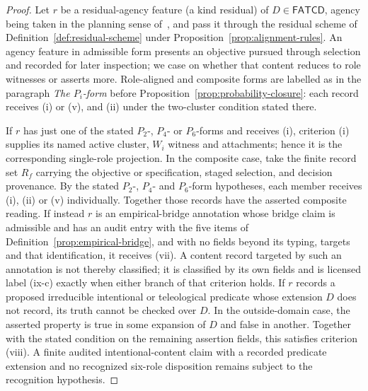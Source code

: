 \documentclass[11pt]{article}
\theoremstyle{definition}
\newcommand{\FATCD}{\ensuremath{\mathsf{FATCD}}}
\begin{document}
\begin{proof}
Let \(r\) be a residual-agency feature (a kind residual) of
\(D \in \FATCD{}\), agency being taken in the planning sense
of~\citet{Bratman1987}, and pass it through the residual scheme of
Definition~\ref{def:residual-scheme} under
Proposition~\ref{prop:alignment-rules}. An agency feature in admissible
form presents an objective pursued through selection and recorded for
later inspection; we case on whether that content reduces to role
witnesses or asserts more. Role-aligned and composite forms are labelled as in the paragraph
\emph{The \(P_i\)-form} before Proposition~\ref{prop:probability-closure}: each
record receives (i) or (v), and (ii) under the two-cluster condition stated
there.

If \(r\) has just one of the stated \(P_2\)-, \(P_4\)- or \(P_6\)-forms and
receives (i), criterion (i) supplies its named active cluster, \(W_i\)
witness and attachments; hence it is the corresponding single-role
projection. In the composite case, take the finite record set \(R_f\) carrying
the objective or specification, staged selection, and decision
provenance. By the stated \(P_2\)-, \(P_4\)- and \(P_6\)-form
hypotheses, each member receives (i), (ii) or (v) individually.
Together those records have the asserted composite reading. If instead \(r\) is an empirical-bridge annotation whose bridge claim is admissible and has an
audit entry with the five items of Definition~\ref{prop:empirical-bridge}, and with
no fields beyond its typing, targets and that identification, it
receives (vii). A content record targeted by such an annotation is not thereby classified; it is classified by its own fields and is licensed label (ix-c) exactly when either branch of that criterion holds. If \(r\) records a
proposed irreducible intentional or teleological predicate whose extension
\(D\) does not record, its truth cannot be checked over \(D\). In the outside-domain case, the asserted property is true in some
expansion of \(D\) and false in another. Together with the stated
condition on the remaining assertion fields, this satisfies
criterion (viii). A finite audited intentional-content claim with a recorded
predicate extension and no recognized six-role disposition remains subject to
the recognition hypothesis.


\end{proof}
\end{document}
